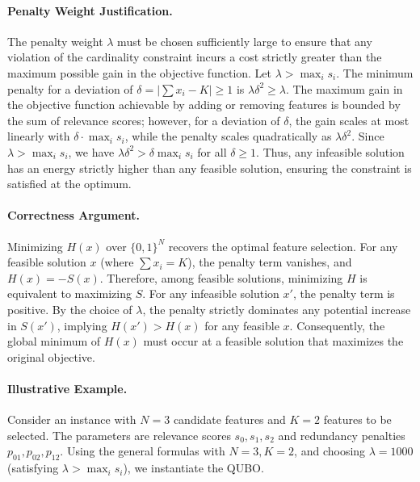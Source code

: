 \documentclass[12pt]{article}
\begin{document}
\paragraph{Penalty Weight Justification.}
The penalty weight $\lambda$ must be chosen sufficiently large to ensure that any violation of the cardinality constraint incurs a cost strictly greater than the maximum possible gain in the objective function. Let $\lambda > \max_{i} s_i$. The minimum penalty for a deviation of $\delta = |\sum x_i - K| \ge 1$ is $\lambda \delta^2 \ge \lambda$. The maximum gain in the objective function achievable by adding or removing features is bounded by the sum of relevance scores; however, for a deviation of $\delta$, the gain scales at most linearly with $\delta \cdot \max_i s_i$, while the penalty scales quadratically as $\lambda \delta^2$. Since $\lambda > \max_i s_i$, we have $\lambda \delta^2 > \delta \max_i s_i$ for all $\delta \ge 1$. Thus, any infeasible solution has an energy strictly higher than any feasible solution, ensuring the constraint is satisfied at the optimum.

\paragraph{Correctness Argument.}
Minimizing $H(x)$ over $\{0,1\}^N$ recovers the optimal feature selection. For any feasible solution $x$ (where $\sum x_i = K$), the penalty term vanishes, and $H(x) = -S(x)$. Therefore, among feasible solutions, minimizing $H$ is equivalent to maximizing $S$. For any infeasible solution $x'$, the penalty term is positive. By the choice of $\lambda$, the penalty strictly dominates any potential increase in $S(x')$, implying $H(x') > H(x)$ for any feasible $x$. Consequently, the global minimum of $H(x)$ must occur at a feasible solution that maximizes the original objective.

\paragraph{Illustrative Example.}
Consider an instance with $N=3$ candidate features and $K=2$ features to be selected. The parameters are relevance scores $s_0, s_1, s_2$ and redundancy penalties $p_{01}, p_{02}, p_{12}$. Using the general formulas with $N=3, K=2$, and choosing $\lambda = 1000$ (satisfying $\lambda > \max_i s_i$), we instantiate the QUBO.
\end{document}
